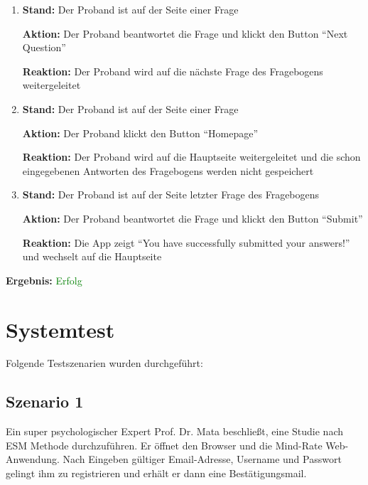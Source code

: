 \documentclass[a4paper]{scrreprt}
\begin{document}
\begin{itemize}
\begin{enumerate}
	        	        \item \par \textbf{Stand: }Der Proband ist auf der Seite einer Frage
	        	        \par \textbf{Aktion: }Der Proband beantwortet die Frage und klickt den Button ``Next Question''
	        	        \par \textbf{Reaktion: }Der Proband wird auf die nächste Frage des Fragebogens weitergeleitet
	        	        \item \par \textbf{Stand: }Der Proband ist auf der Seite einer Frage
	        	        \par \textbf{Aktion: }Der Proband klickt den Button ``Homepage''
	        	        \par \textbf{Reaktion: }Der Proband wird auf die Hauptseite weitergeleitet und die schon eingegebenen Antworten des Fragebogens werden nicht gespeichert
	        	        \item \par \textbf{Stand: }Der Proband ist auf der Seite letzter Frage des Fragebogens
	        	        \par \textbf{Aktion: }Der Proband beantwortet die Frage und klickt den Button ``Submit''
	        	        \par \textbf{Reaktion: }Die App zeigt ``You have successfully submitted your answers!'' und wechselt auf die Hauptseite
	              \end{enumerate}
                               \vspace*{0.3cm}
		      		           \par \textbf{Ergebnis: }\textcolor{green}{Erfolg}
		      		           \vspace*{0.6cm}

              \end{itemize}
	
	
	  \newpage
	  \chapter{Systemtest}
	  Folgende Testszenarien wurden durchgef\"uhrt:
	

		\section{Szenario 1}
                \par Ein super psychologischer Expert Prof. Dr. Mata beschließt, eine Studie nach ESM Methode durchzuf\"uhren. Er \"offnet den Browser und die Mind-Rate Web-Anwendung. Nach Eingeben g\"ultiger Email-Adresse, Username und Passwort gelingt ihm zu registrieren und erh\"alt er dann eine Bestätigungsmail.
\end{document}
